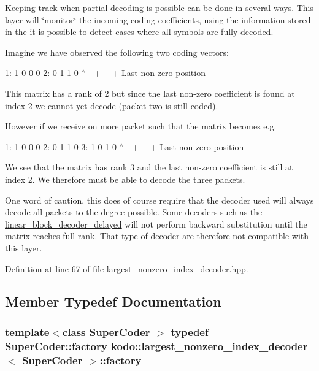 Keeping track when partial decoding is possible can be done in several ways. This layer will \char`\"{}monitor\char`\"{} the incoming coding coefficients, using the information stored in the it is possible to detect cases where all symbols are fully decoded.

Imagine we have observed the following two coding vectors\-:

1\-: 1 0 0 0 2\-: 0 1 1 0 $^\wedge$ $|$ +-\/---+ Last non-\/zero position

This matrix has a rank of 2 but since the last non-\/zero coefficient is found at index 2 we cannot yet decode (packet two is still coded).

However if we receive on more packet such that the matrix becomes e.\-g.

1\-: 1 0 0 0 2\-: 0 1 1 0 3\-: 1 0 1 0 $^\wedge$ $|$ +-\/---+ Last non-\/zero position

We see that the matrix has rank 3 and the last non-\/zero coefficient is still at index 2. We therefore must be able to decode the three packets.

One word of caution, this does of course require that the decoder used will always decode all packets to the degree possible. Some decoders such as the \hyperlink{classkodo_1_1linear__block__decoder__delayed}{linear\-\_\-block\-\_\-decoder\-\_\-delayed} will not perform backward substitution until the matrix reaches full rank. That type of decoder are therefore not compatible with this layer. 

Definition at line 67 of file largest\-\_\-nonzero\-\_\-index\-\_\-decoder.\-hpp.



\subsection{Member Typedef Documentation}
\hypertarget{classkodo_1_1largest__nonzero__index__decoder_a2ad24f3f2995893ad2524bd085e48579}{
\subsubsection[{factory}]{\setlength{\rightskip}{0pt plus 5cm}template$<$class Super\-Coder $>$ typedef Super\-Coder\-::factory {\bf kodo\-::largest\-\_\-nonzero\-\_\-index\-\_\-decoder}$<$ Super\-Coder $>$\-::{\bf factory}}}\label{classkodo_1_1largest__nonzero__index__decoder_a2ad24f3f2995893ad2524bd085e48579}






